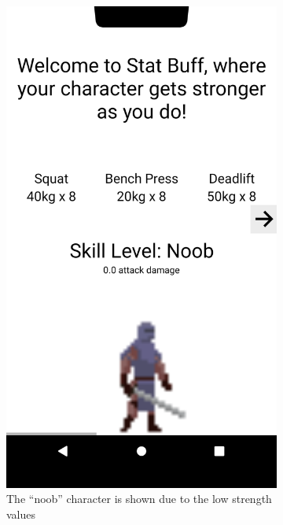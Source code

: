 \documentclass{l4proj}
\begin{document}
\begin{figure}[H]
    \begin{subfigure}{0.45\textwidth}
      \includegraphics[width=\textwidth]{noob.png}    
      \caption{The ``noob'' character is shown due to the low strength values}
    \end{subfigure}
    \begin{subfigure}{0.45\textwidth}

\end{subfigure}
\end{figure}
\end{document}
